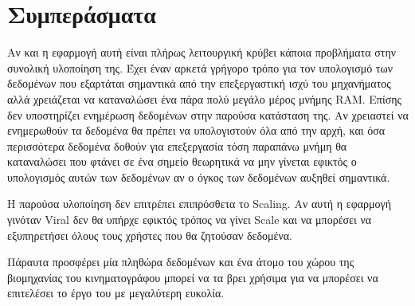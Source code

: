 \chapter{Συμπεράσματα}
Αν και η εφαρμογή αυτή είναι πλήρως λειτουργική κρύβει κάποια προβλήματα στην συνολική υλοποίηση της. Έχει έναν αρκετά γρήγορο τρόπο για τον υπολογισμό των δεδομένων που εξαρτάται σημαντικά από την επεξεργαστική ισχύ του μηχανήματος αλλά χρειάζεται να καταναλώσει ένα πάρα πολύ μεγάλο μέρος μνήμης RAM. Επίσης δεν υποστηρίζει ενημέρωση δεδομένων στην παρούσα κατάσταση της. Αν χρειαστεί να ενημερωθούν τα δεδομένα θα πρέπει να υπολογιστούν όλα από την αρχή, και όσα περισσότερα δεδομένα δοθούν για επεξεργασία τόση παραπάνω μνήμη θα καταναλώσει που φτάνει σε ένα σημείο θεωρητικά να μην γίνεται εφικτός ο υπολογισμός αυτών των δεδομένων αν ο όγκος των δεδομένων αυξηθεί σημαντικά.

Η παρούσα υλοποίηση δεν επιτρέπει επιπρόσθετα το Scaling. Αν αυτή η εφαρμογή γινόταν Viral δεν θα υπήρχε εφικτός τρόπος να γίνει Scale και να μπορέσει να εξυπηρετήσει όλους τους χρήστες που θα ζητούσαν δεδομένα.

Πάραυτα προσφέρει μία πληθώρα δεδομένων και ένα άτομο του χώρου της βιομηχανίας του κινηματογράφου μπορεί να τα βρει χρήσιμα για να μπορέσει να επιτελέσει το έργο του με μεγαλύτερη ευκολία.

